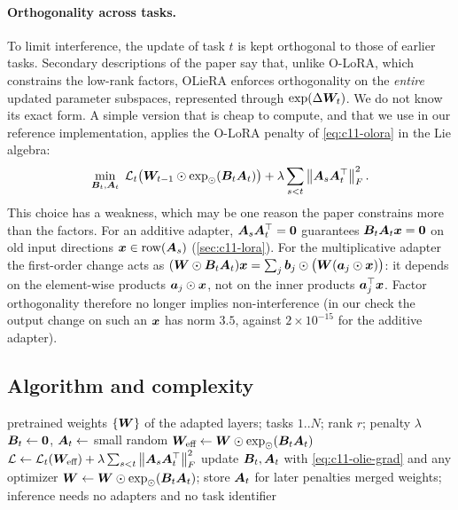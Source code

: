\paragraph{Orthogonality across tasks.} To limit interference, the update of task $t$ is kept
orthogonal to those of earlier tasks. Secondary descriptions of the paper say that, unlike O-LoRA,
which constrains the low-rank factors, OLieRA enforces orthogonality on the \emph{entire} updated
parameter subspaces, represented through $\exp(\Delta\bm{W}_t)$. We do not know its exact form. A
simple version that is cheap to compute, and that we use in our reference implementation, applies
the O-LoRA penalty of \cref{eq:c11-olora} in the Lie algebra:
\begin{equation}
  \min_{\bm{B}_t, \bm{A}_t}\; \mathcal{L}_t\bigl(\bm{W}_{t-1}\odot\exp_{\odot}(\bm{B}_t\bm{A}_t)\bigr) + \lambda\sum_{s<t}\left\lVert \bm{A}_s\bm{A}_t^{\top}\right\rVert_F^2 .
  \label{eq:c11-olie-objective}
\end{equation}
This choice has a weakness, which may be one reason the paper constrains more than the factors. For an
additive adapter, $\bm{A}_s\bm{A}_t^{\top} = \bm{0}$ guarantees $\bm{B}_t\bm{A}_t\bm{x} = \bm{0}$ on old input directions
$\bm{x} \in \operatorname{row}(\bm{A}_s)$ (\cref{sec:c11-lora}). For the multiplicative adapter the
first-order change acts as $(\bm{W}\odot\bm{B}_t\bm{A}_t)\bm{x} = \sum_j\bm{b}_j\odot\bigl(\bm{W}(\bm{a}_j\odot\bm{x})\bigr)$:
it depends on the element-wise products $\bm{a}_j\odot\bm{x}$, not on the inner products $\bm{a}_j^{\top}\bm{x}$.
Factor orthogonality therefore no longer implies non-interference (in our check the output change
on such an $\bm{x}$ has norm $3.5$, against $2\times10^{-15}$ for the additive adapter).

\subsection{Algorithm and complexity}\label{sec:c11-ol-alg}

\begin{algorithm}[t]
\caption{Continual fine-tuning with multiplicative low-rank updates (our formalization of OLieRA).}\label{alg:c11-olie}
\begin{algorithmic}[1]
\Require pretrained weights $\{\bm{W}\}$ of the adapted layers; tasks $1..N$; rank $r$; penalty $\lambda$
  \State $\bm{B}_t \gets \bm{0}$, $\bm{A}_t \gets$ small random 
    \State $\bm{W}_{\text{eff}} \gets \bm{W}\odot\exp_{\odot}(\bm{B}_t\bm{A}_t)$ 
    \State $\mathcal{L} \gets \mathcal{L}_t(\bm{W}_{\text{eff}}) + \lambda\sum_{s<t}\left\lVert \bm{A}_s\bm{A}_t^{\top}\right\rVert_F^2$
    \State update $\bm{B}_t, \bm{A}_t$ with \cref{eq:c11-olie-grad} and any optimizer
  \EndFor
  \State $\bm{W} \gets \bm{W}\odot\exp_{\odot}(\bm{B}_t\bm{A}_t)$; store $\bm{A}_t$ for later penalties 
\EndFor
\Ensure merged weights; inference needs no adapters and no task identifier
\end{algorithmic}
\end{algorithm}

